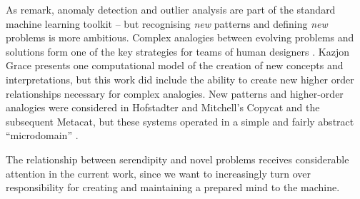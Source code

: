 As \cite[p. 69]{pease2013discussion} remark, anomaly detection and
outlier analysis are part of the standard machine learning toolkit --
but recognising \emph{new} patterns and defining \emph{new} problems
is more ambitious.  Complex analogies between evolving problems and
solutions form one of the key strategies for teams of human designers
\cite{Analogical-problem-evolution-DCC}.  Kazjon Grace
\citeyear{kaz-thesis} presents one computational model of the creation
of new concepts and interpretations, but this work did include the
ability to create new higher order relationships necessary for complex
analogies.  New patterns and higher-order analogies were considered in
Hofstadter and Mitchell's {\sf Copycat} and the subsequent {\sf
  Metacat}, but these systems operated in a simple and fairly abstract
``microdomain''
\cite{hofstadter1994copycat,DBLP:journals/jetai/Marshall06}.  %

The relationship between serendipity and novel problems receives
considerable attention in the current work, since we want to
increasingly turn over responsibility for creating and maintaining a
prepared mind to the machine.
